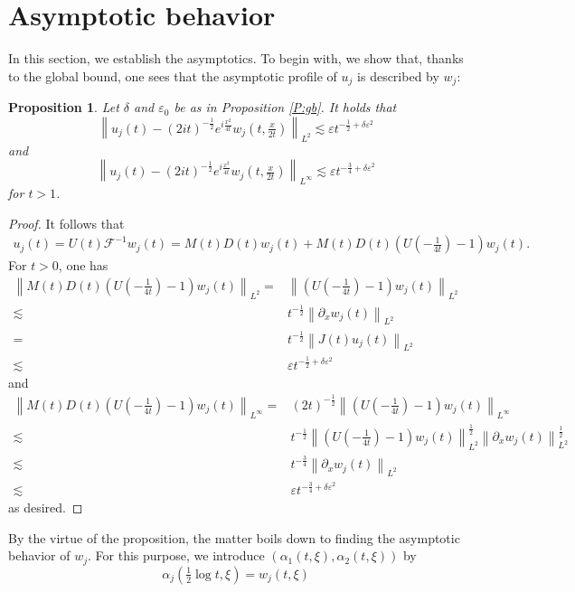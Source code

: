 \documentclass[11pt,a4paper,oneside]{amsart}
\theoremstyle{plain}
\newtheorem{proposition}[theorem]{Proposition}
\theoremstyle{remark}
\numberwithin{equation}{section}
\newcommand{\F}{\mathcal{F}}
\newcommand{\norm}[1]{\left\lVert #1\right\rVert}
\def \F{\mathcal{F}}
\newcommand{\eps}{\varepsilon}
\theoremstyle{definition}
\begin{document}
\section{Asymptotic behavior}\label{S:ab}
In this section, we establish the asymptotics.
To begin with, we show that, thanks to the global bound, one sees that
the asymptotic profile of $u_j$ is described by
$w_j$:
\begin{proposition}\label{P:uw}
Let $\delta$ and $\eps_0$ be as in Proposition \ref{P:gb}.
It holds that
\[
	\norm{u_j(t)- (2it)^{-\frac12} e^{i \frac{x^2}{4t}} w_j(t, \tfrac{x}{2t})
	}_{L^2}
	\lesssim \eps t^{-\frac12 + \delta \eps^2}
\]
and
\[
	\norm{u_j(t)- (2it)^{-\frac12} e^{i \frac{x^2}{4t}} w_j(t, \tfrac{x}{2t})
	}_{L^\infty}
	\lesssim \eps t^{-\frac34 + \delta \eps^2}
\]
for $t>1$.
\end{proposition}
\begin{proof}
It follows that
\begin{align*}
	u_j(t) = U(t) \F^{-1} w_j(t)
	= M(t) D(t) w_j(t) + M(t) D(t) (U(-\tfrac1{4t})-1) w_j(t).
\end{align*}
For $t>0$, one has
\begin{align*}
	\norm{M(t) D(t) (U(-\tfrac1{4t})-1) w_j(t)}_{L^2} ={}& \norm{(U(-\tfrac1{4t})-1) w_j(t)}_{L^2} \\
	\lesssim{}& t^{-\frac12} 
	\norm{\partial_x w_j(t)}_{L^2} \\ 
	={}& t^{-\frac12} 
	\norm{J(t) u_j(t)}_{L^2} \\ 
	\lesssim{}& \eps t^{-\frac12 + \delta \eps^2}
\end{align*}
and
\begin{align*}
	\norm{M(t) D(t) (U(-\tfrac1{4t})-1) w_j(t)}_{L^\infty} ={}& (2t)^{-\frac12}
	\norm{(U(-\tfrac1{4t})-1) w_j(t)}_{L^\infty} \\
	\lesssim{}& t^{-\frac12} 
	\norm{(U(-\tfrac1{4t})-1)w_j(t)}_{L^2}^\frac12
	\norm{\partial_x w_j(t)}_{L^2}^\frac12 \\ 
	\lesssim{}& t^{-\frac34} 
	\norm{\partial_x w_j(t)}_{L^2} \\ 
	\lesssim{}& \eps t^{-\frac34 + \delta \eps^2}
\end{align*}
as desired.
\end{proof}
By the virtue of the proposition,
the matter boils down to finding the asymptotic behavior of $w_j$.
For this purpose, we introduce
 $(\alpha_1(t,\xi),\alpha_2(t,\xi))$ by
\begin{equation}\label{E:alphadef}
	\alpha_j(\tfrac12 \log t,\xi) = w_j (t, \xi)
\end{equation}
\end{document}
